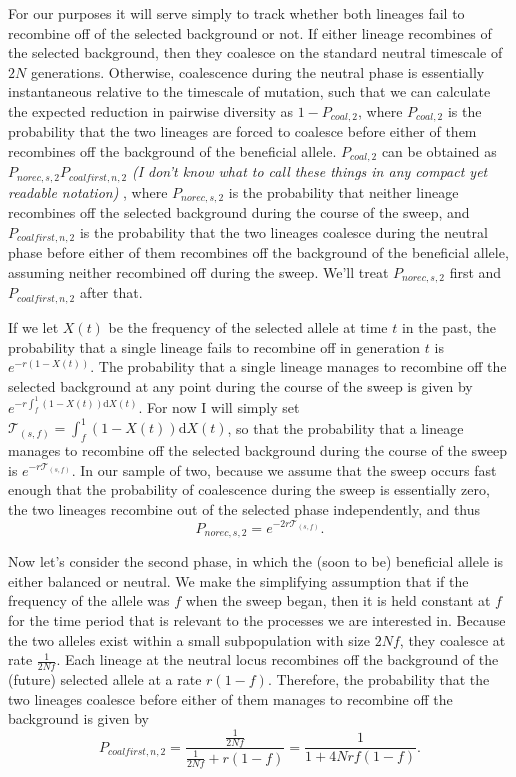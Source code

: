 \documentclass[a4paper,10pt]{article}
\newcommand{\jb}[1]{{\it\color{blue} (#1)} }
\begin{document}
For our purposes it will serve simply to track whether both lineages fail to recombine off of the selected background or not. If either lineage recombines of the selected background, then they coalesce on the standard neutral timescale of $2N$ generations. Otherwise, coalescence during the neutral phase is essentially instantaneous relative to the timescale of mutation, such that we can calculate the expected reduction in pairwise diversity as $1-P_{coal,2}$, where $P_{coal,2}$ is the probability that the two lineages are forced to coalesce before either of them recombines off the background of the beneficial allele. $P_{coal,2}$ can be obtained as $P_{norec,s,2}P_{coalfirst,n,2}$ \jb{I don't know what to call these things in any compact yet readable notation}, where $P_{norec,s,2}$ is the probability that neither lineage recombines off the selected background during the course of the sweep, and $P_{coalfirst,n,2}$ is the probability that the two lineages coalesce during the neutral phase before either of them recombines off the background of the beneficial allele, assuming neither recombined off during the sweep. We'll treat $P_{norec,s,2}$ first and $P_{coalfirst,n,2}$ after that.

If we let $X\left(t\right)$ be the frequency of the selected allele at time $t$ in the past, the probability that a single lineage fails to recombine off in generation $t$ is $e^{-r\left(1-X(t)\right)}$. The probability that a single lineage manages to recombine off the selected background at any point during the course of the sweep is given by $e^{-r \int_f^{1}(1-X\left(t\right))\mathrm{d}X\left(t\right)}$. For now I will simply set $\mathcal{T}_{\left(s,f\right)} = \int_f^{1}(1-X\left(t\right))\mathrm{d}X\left(t\right)$, so that the probability that a lineage manages to recombine off the selected background during the course of the sweep is $e^{-r\mathcal{T}_{\left(s,f\right)}}$. In our sample of two, because we assume that the sweep occurs fast enough that the probability of coalescence during the sweep is essentially zero, the two lineages recombine out of the selected phase independently, and thus
$$P_{norec,s,2} = e^{-2r\mathcal{T}_{\left(s,f\right)}}.$$

Now let's consider the second phase, in which the (soon to be) beneficial allele is either balanced or neutral. We make the simplifying assumption that if the frequency of the allele was $f$ when the sweep began, then it is held constant at $f$ for the time period that is relevant to the processes we are interested in. Because the two alleles exist within a small subpopulation with size $2Nf$, they coalesce at rate $\frac{1}{2Nf}$. Each lineage at the neutral locus recombines off the background of the (future) selected allele at a rate $r(1-f)$. Therefore, the probability that the two lineages coalesce before either of them manages to recombine off the background is given by
$$P_{coalfirst,n,2} = \frac{\frac{1}{2Nf}}{\frac{1}{2Nf} + r(1-f)} = \frac{1}{1 + 4Nrf(1-f)}.$$
\end{document}
